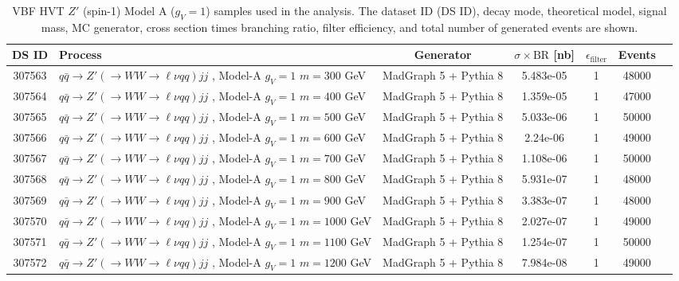 \begin{landscape}
\begin{table}[!htb]
\caption[HVT $Z'$ Monte Carlo samples (vector boson fusion production)]{VBF HVT $Z'$ (spin-1) Model A ($g_V=1$) samples used in the analysis. The dataset ID (DS ID), decay mode, theoretical model, signal mass, MC generator, cross section times branching ratio, filter efficiency, and total number of generated events are shown.}
\label{tabular:mc_samples_ZprimeVBF}
\begin{footnotesize}
\begin{center}
\begin{tabular}{c|l|c|c|c|cr}
	\hline\hline
	DS ID & Process & Generator & $\sigma\times\text{BR}$ [nb] & $\epsilon_{\text{filter}}$ & Events \\ \hline\hline
	307563 & $q\bar{q} \to Z'\left(\to WW \to \ell\nu qq\right) jj$ , Model-A $g_V=1$ $m=300$  GeV& MadGraph 5 + Pythia 8 & 5.483e-05 & 1  & 48000 \\
	307564 & $q\bar{q} \to Z'\left(\to WW \to \ell\nu qq\right) jj$ , Model-A $g_V=1$ $m=400$  GeV& MadGraph 5 + Pythia 8 & 1.359e-05 & 1  & 47000 \\
	307565 & $q\bar{q} \to Z'\left(\to WW \to \ell\nu qq\right) jj$ , Model-A $g_V=1$ $m=500$  GeV& MadGraph 5 + Pythia 8 & 5.033e-06 & 1  & 50000 \\
	307566 & $q\bar{q} \to Z'\left(\to WW \to \ell\nu qq\right) jj$ , Model-A $g_V=1$ $m=600$  GeV& MadGraph 5 + Pythia 8 & 2.24e-06 & 1  & 49000 \\ 
	307567 & $q\bar{q} \to Z'\left(\to WW \to \ell\nu qq\right) jj$ , Model-A $g_V=1$ $m=700$  GeV& MadGraph 5 + Pythia 8 & 1.108e-06 & 1  & 50000 \\
	307568 & $q\bar{q} \to Z'\left(\to WW \to \ell\nu qq\right) jj$ , Model-A $g_V=1$ $m=800$  GeV& MadGraph 5 + Pythia 8 & 5.931e-07 & 1  & 48000 \\
	307569 & $q\bar{q} \to Z'\left(\to WW \to \ell\nu qq\right) jj$ , Model-A $g_V=1$ $m=900$  GeV& MadGraph 5 + Pythia 8 & 3.383e-07 & 1  & 48000 \\
	307570 & $q\bar{q} \to Z'\left(\to WW \to \ell\nu qq\right) jj$ , Model-A $g_V=1$ $m=1000$ GeV& MadGraph 5 + Pythia 8 & 2.027e-07 & 1  & 49000 \\
	307571 & $q\bar{q} \to Z'\left(\to WW \to \ell\nu qq\right) jj$ , Model-A $g_V=1$ $m=1100$ GeV& MadGraph 5 + Pythia 8  & 1.254e-07 & 1  & 50000 \\
	307572 & $q\bar{q} \to Z'\left(\to WW \to \ell\nu qq\right) jj$ , Model-A $g_V=1$ $m=1200$ GeV& MadGraph 5 + Pythia 8 & 7.984e-08 & 1  & 49000 \\

\end{tabular}
\end{center}
\end{footnotesize}
\end{table}
\end{landscape}
